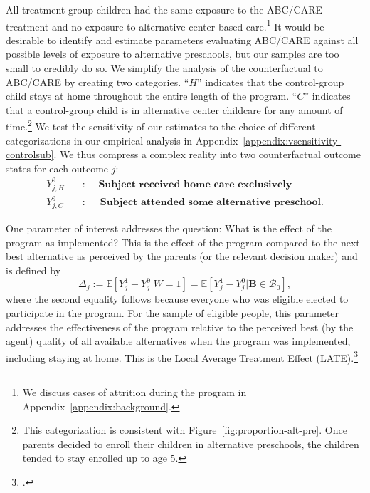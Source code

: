All treatment-group children had the same exposure to the ABC/CARE treatment and no exposure to alternative center-based care.\footnote{We discuss cases of attrition during the program in Appendix~\ref{appendix:background}.} It would be desirable to identify and estimate parameters evaluating ABC/CARE against all possible levels of exposure to alternative preschools, but our samples are too small to credibly do so. We simplify the analysis of the counterfactual to ABC/CARE by creating two categories. ``$H$'' indicates that the control-group child stays at home throughout the entire length of the program. ``$C$'' indicates that a control-group child is in alternative center childcare for any amount of time.\footnote{This categorization is consistent with Figure~\ref{fig:proportion-alt-pre}. Once parents decided to enroll their children in alternative preschools, the children tended to stay enrolled up to age 5.} We test the sensitivity of our estimates to the choice of different categorizations in our empirical analysis in Appendix~\ref{appendix:vsensitivity-controlsub}. We thus compress a complex reality into two counterfactual outcome states for each outcome $j$:
\begin{align*}
Y_{j,H}^0 \quad &: \quad \textbf{ Subject received home care exclusively} \\
Y_{j,C}^0 \quad &: \quad \textbf{ Subject attended some alternative preschool}.
\end{align*}


One parameter of interest addresses the question: What is the effect of the program as implemented? This is the effect of the program compared to the next best alternative as perceived by the parents (or the relevant decision maker) and is defined by
\begin{equation}\label{eq:effect}
\Delta_j := \mathbb{E} \left[ Y_{j}^1 -  Y_{j}^0 | W =1 \right] = \mathbb{E} \left[Y_{j}^1 -  Y_{j}^0 | \bm{B} \in \mathcal{B}_0 \right],
\end{equation}
where the second equality follows because everyone who was eligible elected to participate in the program. For the sample of eligible people, this parameter addresses the effectiveness of the program relative to the perceived best (by the agent) quality of all available alternatives when the program was implemented, including staying at home. This is the Local Average Treatment Effect (LATE).\footnote{\citet{Imbens_Angrist_1994_Econometrica}.}

